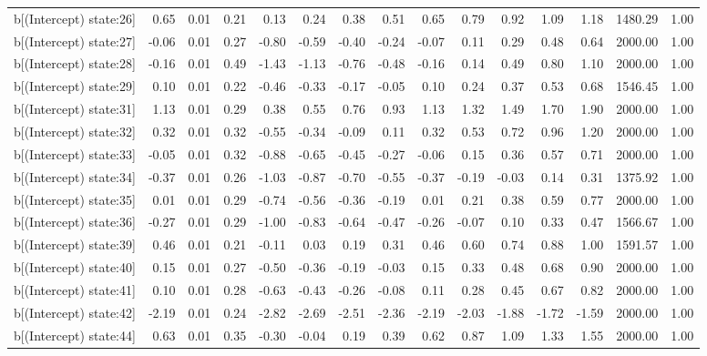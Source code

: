 \begin{table}[ht]
\begin{tabular}{rrrrrrrrrrrrrrr}
  b[(Intercept) state:26] & 0.65 & 0.01 & 0.21 & 0.13 & 0.24 & 0.38 & 0.51 & 0.65 & 0.79 & 0.92 & 1.09 & 1.18 & 1480.29 & 1.00 \\ 
  b[(Intercept) state:27] & -0.06 & 0.01 & 0.27 & -0.80 & -0.59 & -0.40 & -0.24 & -0.07 & 0.11 & 0.29 & 0.48 & 0.64 & 2000.00 & 1.00 \\ 
  b[(Intercept) state:28] & -0.16 & 0.01 & 0.49 & -1.43 & -1.13 & -0.76 & -0.48 & -0.16 & 0.14 & 0.49 & 0.80 & 1.10 & 2000.00 & 1.00 \\ 
  b[(Intercept) state:29] & 0.10 & 0.01 & 0.22 & -0.46 & -0.33 & -0.17 & -0.05 & 0.10 & 0.24 & 0.37 & 0.53 & 0.68 & 1546.45 & 1.00 \\ 
  b[(Intercept) state:31] & 1.13 & 0.01 & 0.29 & 0.38 & 0.55 & 0.76 & 0.93 & 1.13 & 1.32 & 1.49 & 1.70 & 1.90 & 2000.00 & 1.00 \\ 
  b[(Intercept) state:32] & 0.32 & 0.01 & 0.32 & -0.55 & -0.34 & -0.09 & 0.11 & 0.32 & 0.53 & 0.72 & 0.96 & 1.20 & 2000.00 & 1.00 \\ 
  b[(Intercept) state:33] & -0.05 & 0.01 & 0.32 & -0.88 & -0.65 & -0.45 & -0.27 & -0.06 & 0.15 & 0.36 & 0.57 & 0.71 & 2000.00 & 1.00 \\ 
  b[(Intercept) state:34] & -0.37 & 0.01 & 0.26 & -1.03 & -0.87 & -0.70 & -0.55 & -0.37 & -0.19 & -0.03 & 0.14 & 0.31 & 1375.92 & 1.00 \\ 
  b[(Intercept) state:35] & 0.01 & 0.01 & 0.29 & -0.74 & -0.56 & -0.36 & -0.19 & 0.01 & 0.21 & 0.38 & 0.59 & 0.77 & 2000.00 & 1.00 \\ 
  b[(Intercept) state:36] & -0.27 & 0.01 & 0.29 & -1.00 & -0.83 & -0.64 & -0.47 & -0.26 & -0.07 & 0.10 & 0.33 & 0.47 & 1566.67 & 1.00 \\ 
  b[(Intercept) state:39] & 0.46 & 0.01 & 0.21 & -0.11 & 0.03 & 0.19 & 0.31 & 0.46 & 0.60 & 0.74 & 0.88 & 1.00 & 1591.57 & 1.00 \\ 
  b[(Intercept) state:40] & 0.15 & 0.01 & 0.27 & -0.50 & -0.36 & -0.19 & -0.03 & 0.15 & 0.33 & 0.48 & 0.68 & 0.90 & 2000.00 & 1.00 \\ 
  b[(Intercept) state:41] & 0.10 & 0.01 & 0.28 & -0.63 & -0.43 & -0.26 & -0.08 & 0.11 & 0.28 & 0.45 & 0.67 & 0.82 & 2000.00 & 1.00 \\ 
  b[(Intercept) state:42] & -2.19 & 0.01 & 0.24 & -2.82 & -2.69 & -2.51 & -2.36 & -2.19 & -2.03 & -1.88 & -1.72 & -1.59 & 2000.00 & 1.00 \\ 
  b[(Intercept) state:44] & 0.63 & 0.01 & 0.35 & -0.30 & -0.04 & 0.19 & 0.39 & 0.62 & 0.87 & 1.09 & 1.33 & 1.55 & 2000.00 & 1.00 \\ 

\end{tabular}
\end{table}
